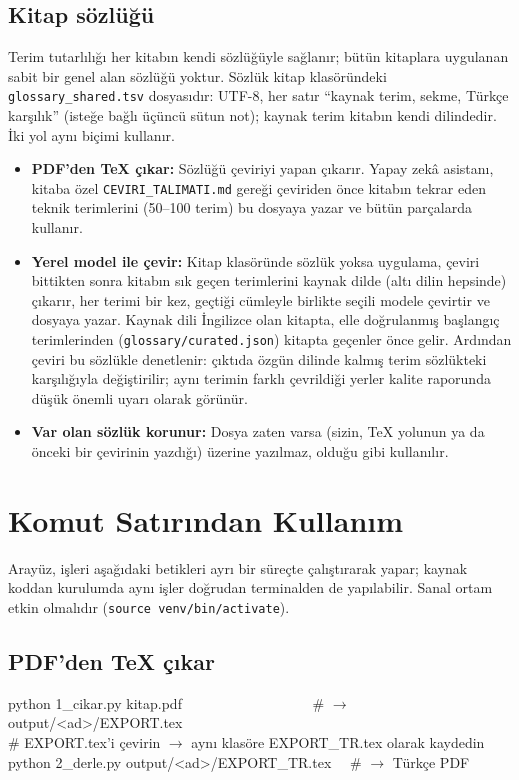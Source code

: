 \documentclass[11pt,a4paper]{article}
\newcommand{\dosya}[1]{\texttt{#1}}
\begin{document}
\subsection{Kitap sözlüğü}\label{sec:sozluk}
Terim tutarlılığı her kitabın kendi sözlüğüyle sağlanır; bütün kitaplara
uygulanan sabit bir genel alan sözlüğü yoktur. Sözlük kitap klasöründeki
\dosya{glossary\_shared.tsv} dosyasıdır: UTF-8, her satır ``kaynak terim,
sekme, Türkçe karşılık'' (isteğe bağlı üçüncü sütun not); kaynak terim
kitabın kendi dilindedir. İki yol aynı biçimi kullanır.

\begin{itemize}
  \item \textbf{PDF'den TeX çıkar:} Sözlüğü çeviriyi yapan çıkarır. Yapay
        zekâ asistanı, kitaba özel \dosya{CEVIRI\_TALIMATI.md} gereği
        çeviriden önce kitabın tekrar eden teknik terimlerini (50--100 terim)
        bu dosyaya yazar ve bütün parçalarda kullanır.
  \item \textbf{Yerel model ile çevir:} Kitap klasöründe sözlük yoksa
        uygulama, çeviri bittikten sonra kitabın sık geçen terimlerini kaynak
        dilde (altı dilin hepsinde) çıkarır, her terimi bir kez, geçtiği
        cümleyle birlikte seçili modele çevirtir ve dosyaya yazar. Kaynak dili
        İngilizce olan kitapta, elle doğrulanmış başlangıç terimlerinden
        (\dosya{glossary/\allowbreak curated.json}) kitapta geçenler önce
        gelir. Ardından çeviri bu sözlükle denetlenir: çıktıda özgün dilinde
        kalmış terim sözlükteki karşılığıyla değiştirilir; aynı terimin
        farklı çevrildiği yerler kalite raporunda düşük önemli uyarı olarak
        görünür.
  \item \textbf{Var olan sözlük korunur:} Dosya zaten varsa (sizin, TeX
        yolunun ya da önceki bir çevirinin yazdığı) üzerine yazılmaz, olduğu
        gibi kullanılır.
\end{itemize}

\section{Komut Satırından Kullanım}\label{sec:komut}

Arayüz, işleri aşağıdaki betikleri ayrı bir süreçte çalıştırarak yapar;
kaynak koddan kurulumda aynı işler doğrudan terminalden de yapılabilir. Sanal
ortam etkin olmalıdır (\dosya{source venv/bin/activate}).

\subsection{PDF'den TeX çıkar}
\begin{komut}
python 1\_cikar.py kitap.pdf \ \ \ \ \ \ \ \ \ \ \ \ \ \ \ \ \ \ \# \(\rightarrow\) output/<ad>/EXPORT.tex\\
\# EXPORT.tex'i çevirin \(\rightarrow\) aynı klasöre EXPORT\_TR.tex olarak kaydedin\\
python 2\_derle.py output/<ad>/EXPORT\_TR.tex \ \ \# \(\rightarrow\) Türkçe PDF
\end{komut}
\end{document}
